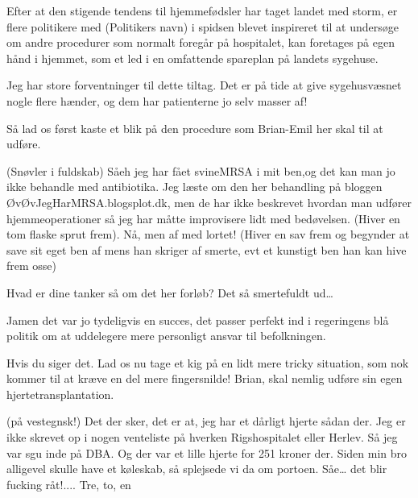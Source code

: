 \documentclass[a4paper,11pt]{article}
\begin{document}
\begin{sketch}




 Efter at den stigende tendens til hjemmefødsler har taget landet med storm, er flere politikere med (Politikers navn) i spidsen blevet inspireret til at undersøge om andre procedurer som normalt foregår på hospitalet, kan foretages på egen hånd i hjemmet, som et led i en omfattende spareplan på landets sygehuse.  

 Jeg har store forventninger til dette tiltag. Det er på tide at give sygehusvæsnet nogle flere hænder, og dem har patienterne jo selv masser af! 

 Så lad os først kaste et blik på den procedure som Brian-Emil her skal til at udføre. 

 (Snøvler i fuldskab) Såeh jeg har fået svineMRSA i mit ben,og det kan man jo ikke behandle med antibiotika. Jeg læste om den her behandling på bloggen ØvØvJegHarMRSA.blogsplot.dk, men de har ikke beskrevet hvordan man udfører hjemmeoperationer så jeg har måtte improvisere lidt med bedøvelsen. (Hiver en  tom flaske sprut frem). Nå, men af med lortet! (Hiver en sav frem og begynder at save sit eget ben af mens han skriger af smerte, evt et kunstigt ben han kan hive frem osse) 

Hvad er dine tanker så om det her forløb? Det så smertefuldt ud… 

 Jamen det var jo tydeligvis en succes, det passer perfekt ind i regeringens blå politik om at uddelegere mere personligt ansvar til befolkningen.

 Hvis du siger det. Lad os nu tage et kig på en lidt mere tricky situation, som nok kommer til at kræve en del mere fingersnilde! 
Brian, skal nemlig udføre sin egen hjertetransplantation. 

(på vestegnsk!) Det der sker, det er at, jeg har et dårligt hjerte sådan der. Jeg er ikke skrevet op i nogen venteliste på hverken Rigshospitalet eller Herlev. 
Så jeg var sgu inde på DBA. Og der var  et lille hjerte for 251 kroner der. Siden min bro alligevel skulle have et køleskab, så splejsede vi da om portoen. Såe… det blir fucking råt!....
 Tre, to, en 


\end{sketch}
\end{document}
